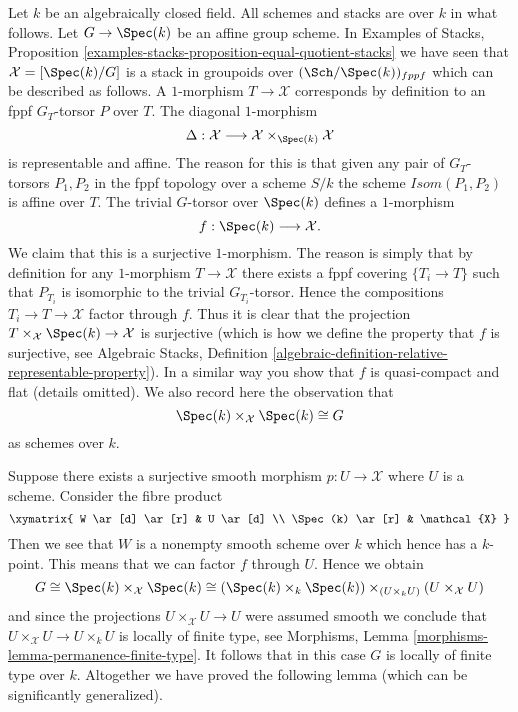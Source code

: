 \medskip\noindent
Let $k$ be an algebraically closed field.
All schemes and stacks are over $k$ in what follows.
Let $G \to \Spec(k)$ be an affine group scheme.
In
Examples of Stacks,
Proposition \ref{examples-stacks-proposition-equal-quotient-stacks}
we have seen that
$\mathcal{X} = [\Spec(k)/G]$ is a stack in groupoids over
$(\Sch/\Spec(k))_{fppf}$ which can be described
as follows. A $1$-morphism $T \to \mathcal{X}$
corresponds by definition to an fppf $G_T$-torsor $P$ over $T$.
The diagonal $1$-morphism
$$
\Delta :
\mathcal{X}
\longrightarrow
\mathcal{X} \times_{\Spec(k)} \mathcal{X}
$$
is representable and affine. The reason for this is that given any pair
of $G_T$-torsors $P_1, P_2$ in the fppf topology over a scheme $S/k$ the
scheme $\mathit{Isom}(P_1, P_2)$ is affine over $T$.
The trivial $G$-torsor over $\Spec(k)$ defines a $1$-morphism
$$
f : \Spec(k) \longrightarrow \mathcal{X}.
$$
We claim that this is a surjective $1$-morphism. The reason is simply
that by definition for any $1$-morphism $T \to \mathcal{X}$ there exists
a fppf covering $\{T_i \to T\}$ such that $P_{T_i}$ is isomorphic
to the trivial $G_{T_i}$-torsor. Hence the compositions
$T_i \to T \to \mathcal{X}$ factor through $f$. Thus it is clear that
the projection $T \times_\mathcal{X} \Spec(k) \to \mathcal{X}$
is surjective (which is how we define the property that $f$ is surjective, see
Algebraic Stacks,
Definition \ref{algebraic-definition-relative-representable-property}).
In a similar way you show that $f$ is quasi-compact and flat (details omitted).
We also record here the observation that
$$
\Spec(k) \times_\mathcal{X} \Spec(k) \cong G
$$
as schemes over $k$.

\medskip\noindent
Suppose there exists a surjective smooth morphism
$p : U \to \mathcal{X}$ where $U$ is a scheme.
Consider the fibre product
$$
\xymatrix{
W \ar[d] \ar[r] & U \ar[d] \\
\Spec(k) \ar[r] & \mathcal{X}
}
$$
Then we see that $W$ is a nonempty smooth scheme over $k$ which
hence has a $k$-point. This means that we can factor $f$ through $U$.
Hence we obtain
$$
G \cong
\Spec(k) \times_\mathcal{X} \Spec(k) \cong
(\Spec(k) \times_k \Spec(k))
\times_{(U \times_k U)}
(U \times_\mathcal{X} U)
$$
and since the projections $U \times_\mathcal{X} U \to U$ were
assumed smooth we conclude that
$U \times_\mathcal{X} U \to U \times_k U$ is
locally of finite type, see
Morphisms, Lemma \ref{morphisms-lemma-permanence-finite-type}.
It follows that in this case $G$ is locally of finite type over $k$.
Altogether we have proved the following lemma (which can be
significantly generalized).

